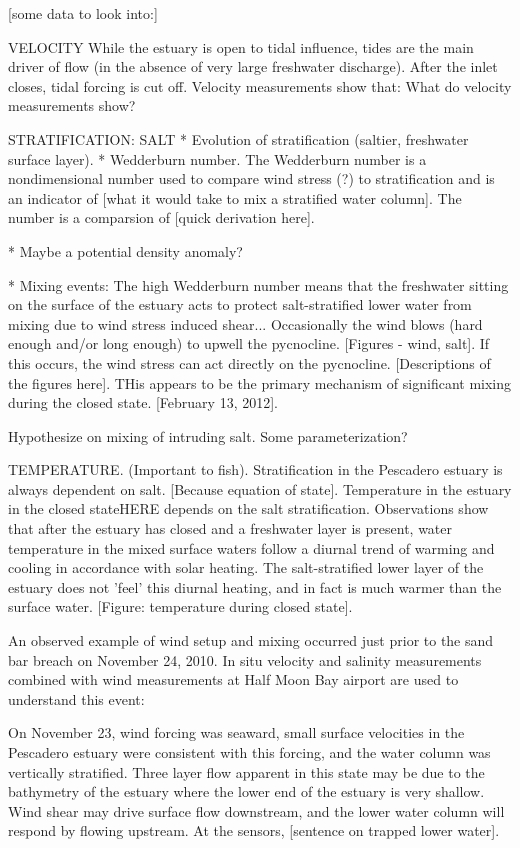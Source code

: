 [some data to look into:]



VELOCITY
While the estuary is open to tidal influence, tides are the main driver of flow (in the absence of very large freshwater discharge). After the inlet closes, tidal forcing is cut off. Velocity measurements show that: {What do velocity measurements show?}

STRATIFICATION:
SALT
* Evolution of stratification (saltier, freshwater surface layer). 
* Wedderburn number. The Wedderburn number is a nondimensional number used to compare wind stress (?) to stratification and is an indicator of [what it would take to mix a stratified water column]. The number is a comparsion of [quick derivation here]. 


* Maybe a potential density anomaly?


* Mixing events:
The high Wedderburn number means that the freshwater sitting on the surface of the estuary acts to protect salt-stratified lower water from mixing due to wind stress induced shear... Occasionally the wind blows (hard enough and/or long enough) to upwell the pycnocline. [Figures - wind, salt]. If this occurs, the wind stress can act directly on the pycnocline. [Descriptions of the figures here].  THis appears to be the primary mechanism of significant mixing during the closed state.  [February 13, 2012]. 



Hypothesize on mixing of intruding salt. Some parameterization?

TEMPERATURE. (Important to fish).
Stratification in the Pescadero estuary is always dependent on salt. [Because equation of state]. Temperature in the estuary in the closed state{HERE} depends on the salt stratification. Observations show that after the estuary has closed and a freshwater layer is present, water temperature in the mixed surface waters follow a diurnal trend of warming and cooling in accordance with solar heating. The salt-stratified lower layer of the estuary does not 'feel' this diurnal heating, and in fact is much warmer than the surface water. [Figure: temperature during closed state]. 


An observed example of wind setup and mixing occurred just prior to the sand bar breach on November 24, 2010. In situ velocity and salinity measurements combined with wind measurements at Half Moon Bay airport are used to understand this event:

On November 23, wind forcing was seaward, small surface velocities in the Pescadero estuary were consistent with this forcing, and the water column was vertically stratified. Three layer flow apparent in this state may be due to the bathymetry of the estuary where the lower end of the estuary is very shallow. Wind shear may drive surface flow downstream, and the lower water column will respond by flowing upstream. At the sensors, [sentence on trapped lower water]. 

